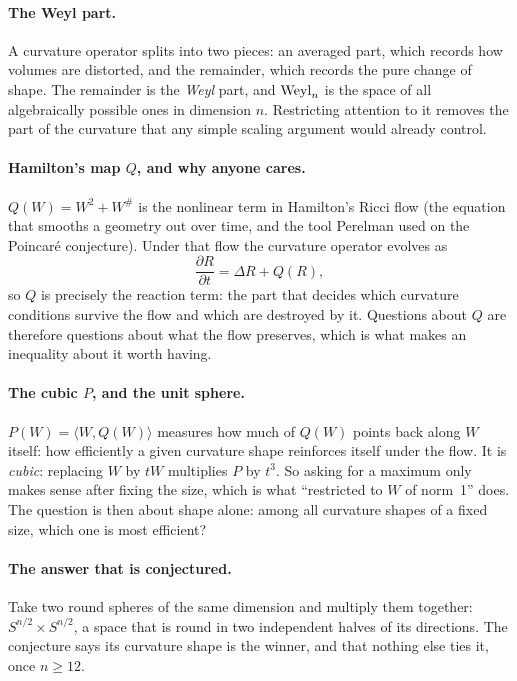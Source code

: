 \paragraph{The Weyl part.} A curvature operator splits into two pieces: an averaged part, which records how volumes are distorted, and the remainder, which records the pure change of shape. The remainder is the \emph{Weyl} part, and $\mathrm{Weyl}_n$ is the space of all algebraically possible ones in dimension $n$. Restricting attention to it removes the part of the curvature that any simple scaling argument would already control.

\paragraph{Hamilton's map $Q$, and why anyone cares.} $Q(W)=W^2+W^{\#}$ is the nonlinear term in Hamilton's Ricci flow (the equation that smooths a geometry out over time, and the tool Perelman used on the Poincar\'e conjecture). Under that flow the curvature operator evolves as
\[
\frac{\partial R}{\partial t}=\Delta R+Q(R),
\]
so $Q$ is precisely the reaction term: the part that decides which curvature conditions survive the flow and which are destroyed by it. Questions about $Q$ are therefore questions about what the flow preserves, which is what makes an inequality about it worth having.

\paragraph{The cubic $P$, and the unit sphere.} $P(W)=\langle W,Q(W)\rangle$ measures how much of $Q(W)$ points back along $W$ itself: how efficiently a given curvature shape reinforces itself under the flow. It is \emph{cubic}: replacing $W$ by $tW$ multiplies $P$ by $t^3$. So asking for a maximum only makes sense after fixing the size, which is what ``restricted to $W$ of norm~1'' does. The question is then about shape alone: among all curvature shapes of a fixed size, which one is most efficient?

\paragraph{The answer that is conjectured.} Take two round spheres of the same dimension and multiply them together: $S^{n/2}\times S^{n/2}$, a space that is round in two independent halves of its directions. The conjecture says its curvature shape is the winner, and that nothing else ties it, once $n\ge12$.

